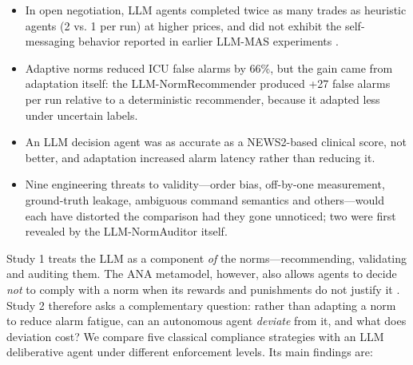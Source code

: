 \documentclass{ieeeaccess}
\begin{document}
\begin{itemize}
\item In open negotiation, LLM agents completed twice as many trades as heuristic agents (2 vs. 1 per run) at higher prices, and did not exhibit the self-messaging behavior reported in earlier LLM-MAS experiments \cite{nascimento2023selfadaptive}.
\item Adaptive norms reduced ICU false alarms by 66\%, but the gain came from adaptation itself: the LLM-NormRecommender produced +27 false alarms per run relative to a deterministic recommender, because it adapted less under uncertain labels.
\item An LLM decision agent was as accurate as a NEWS2-based clinical score, not better, and adaptation increased alarm latency rather than reducing it.
\item Nine engineering threats to validity—order bias, off-by-one measurement, ground-truth leakage, ambiguous command semantics and others—would each have distorted the comparison had they gone unnoticed; two were first revealed by the LLM-NormAuditor itself.
\end{itemize}

Study 1 treats the LLM as a component \emph{of} the norms—recommending, validating and auditing them. The ANA metamodel, however, also allows agents to decide \emph{not} to comply with a norm when its rewards and punishments do not justify it \cite{viana2022creating}. Study 2 therefore asks a complementary question: rather than adapting a norm to reduce alarm fatigue, can an autonomous agent \emph{deviate} from it, and what does deviation cost? We compare five classical compliance strategies \cite{lopez2002constraining} with an LLM deliberative agent under different enforcement levels. Its main findings are:
\end{document}
